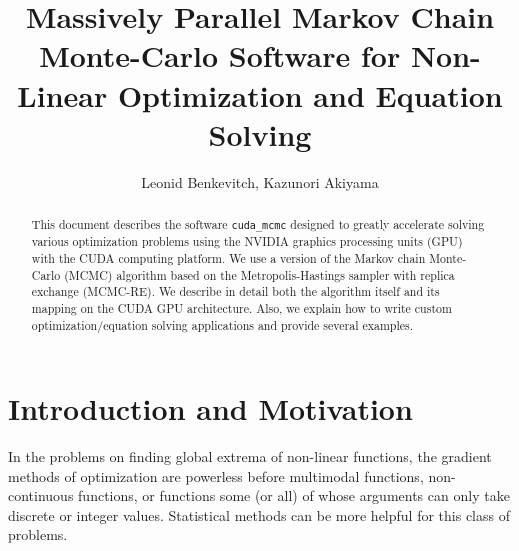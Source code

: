 \documentclass[preprint2]{aastex}
\begin{document}
\title{Massively Parallel Markov Chain Monte-Carlo Software for Non-Linear Optimization and Equation Solving}

\author{Leonid Benkevitch, Kazunori Akiyama}

\begin{abstract} \small 
This document describes the software \verb|cuda_mcmc| designed to greatly accelerate solving various optimization problems using the NVIDIA graphics processing units (GPU) with the CUDA computing platform. We use a version of the Markov chain Monte-Carlo (MCMC) algorithm based on the Metropolis-Hastings sampler with replica exchange (MCMC-RE). We describe in detail both the algorithm itself and its mapping on the CUDA GPU architecture. Also, we explain how to write custom optimization/equation solving applications and provide several examples. \\
\end{abstract}

\tableofcontents
\newpage


\section{Introduction and Motivation}\label{intro}

In the problems on finding global extrema of non-linear functions, the gradient methods of optimization are powerless before multimodal functions, non-continuous functions, or functions some (or all) of whose arguments can only take discrete or integer values. Statistical methods can be more helpful for this class of problems. 
\end{document}
